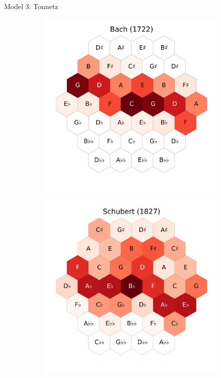 \documentclass[final,cmyk]{beamer}
\begin{document}
\begin{frame}[t]
\begin{minipage}[t][.68\textheight][t]{\textwidth}
\begin{columns}[t]
\begin{column}{0.3\textwidth}
\begin{block}{Model 3: Tonnetz}
\begin{figure}
\begin{subfigure}{\textwidth}
					\includegraphics[width=\textwidth]{img/bach_tonnetz.png}
				\end{subfigure}
				\begin{subfigure}{\textwidth} %
					\includegraphics[width=\textwidth]{img/schubert_tonnetz.png}
				\end{subfigure}
			\end{figure}


\end{block}
\end{column}
\end{columns}
\end{minipage}
\end{frame}
\end{document}
